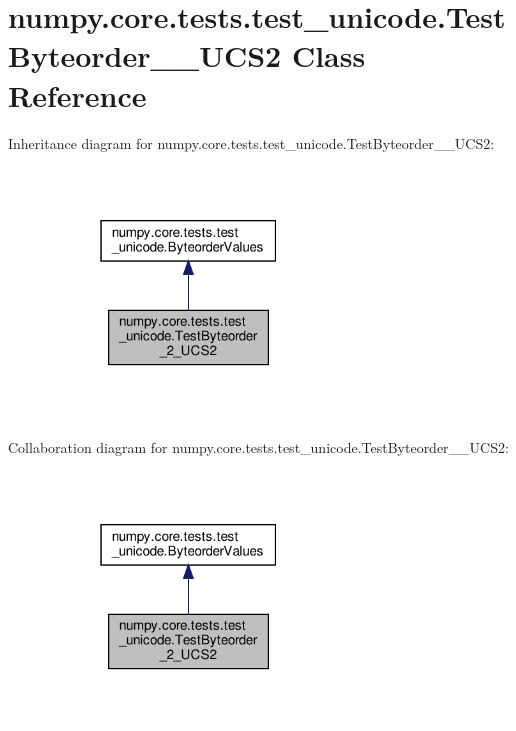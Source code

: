 \hypertarget{classnumpy_1_1core_1_1tests_1_1test__unicode_1_1TestByteorder__2__UCS2}{}\section{numpy.\+core.\+tests.\+test\+\_\+unicode.\+Test\+Byteorder\+\_\+\_\+\+U\+C\+S2 Class Reference}
\label{classnumpy_1_1core_1_1tests_1_1test__unicode_1_1TestByteorder__2__UCS2}


Inheritance diagram for numpy.\+core.\+tests.\+test\+\_\+unicode.\+Test\+Byteorder\+\_\+\_\+\+U\+C\+S2\+:
\nopagebreak
\begin{figure}[H]
\begin{center}
\leavevmode
\includegraphics[width=211pt]{classnumpy_1_1core_1_1tests_1_1test__unicode_1_1TestByteorder__2__UCS2__inherit__graph}
\end{center}
\end{figure}


Collaboration diagram for numpy.\+core.\+tests.\+test\+\_\+unicode.\+Test\+Byteorder\+\_\+\_\+\+U\+C\+S2\+:
\nopagebreak
\begin{figure}[H]
\begin{center}
\leavevmode
\includegraphics[width=211pt]{classnumpy_1_1core_1_1tests_1_1test__unicode_1_1TestByteorder__2__UCS2__coll__graph}
\end{center}
\end{figure}
